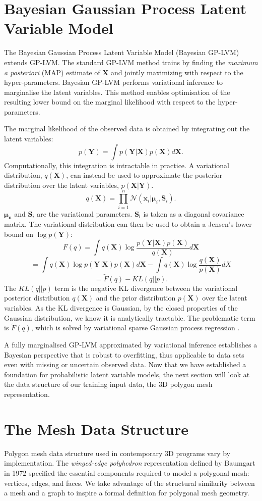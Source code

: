 \documentclass[ %
author={Dillon Keith Diep},
supervisor={Dr. Carl Henrik Ek},
degree={MEng},
title={ART-CG Hair:},
subtitle={Assisted Real-time Content Generation of Stylised Virtual Hair},
type={Research},
year={2017} ]{dissertation}
\begin{document}
\section{Bayesian Gaussian Process Latent Variable Model}
The Bayesian Gaussian Process Latent Variable Model (Bayesian GP-LVM) \cite{bgplvm} extends GP-LVM. The standard GP-LVM method trains by finding the \textit{maximum a posteriori} (MAP) estimate of $\bm{X}$ and jointly maximizing with respect to the hyper-parameters. Bayesian GP-LVM performs variational inference to marginalise the latent variables. This method enables optimisation of the resulting lower bound on the marginal likelihood with respect to the hyper-parameters. 

The marginal likelihood of the observed data is obtained by integrating out the latent variables:
$$p(\bm{Y})=\int p(\bm{Y|X})p(\bm{X})d\bm{X}.$$
Computationally, this integration is intractable in practice. A variational distribution, $q(\bm{X})$, can instead be used to approximate the posterior distribution over the latent variables, $p(\bm{X|Y})$.
$$q(\bm{X})=\prod^n_{i=1}\mathcal{N}(\bm{x}_i|\bm{\mu}_i,\bm{S}_i).$$
$\bm{\mu_n}$ and $\bm{S}_i$ are the variational parameters. $\bm{S_i}$ is taken as a diagonal covariance matrix. 
The variational distribution can then be used to obtain a Jensen's lower bound on $\log p(\bm{Y})$:
$$F(q)=\int q(\bm{X})\log \frac{ p(\bm{Y|X})p(\bm{X}) }{ q(\bm{X}) } d\bm{X}$$
$$=\int q(\bm{X})\log p(\bm{Y|X})p(\bm{X})d\bm{X} - \int q(\bm{X})\log\frac{q(\bm{X})}{p(\bm{X})}dX$$
$$=\tilde{F}(q)-KL(q||p).$$
The $KL(q||p)$ term is the negative KL divergence between the variational posterior distribution $q(\bm{X})$ and the prior distribution $p(\bm{X})$ over the latent variables. As the KL divergence is Gaussian, by the closed properties of the Gaussian distribution, we know it is analytically tractable. The problematic term is $\tilde{F}(q)$, which is solved by variational sparse Gaussian process regression \cite{bgplvm}.

A fully marginalised GP-LVM approximated by variational inference establishes a Bayesian perspective that is robust to overfitting, thus applicable to data sets even with missing or uncertain observed data. Now that we have established a foundation for probabilistic latent variable models, the next section will look at the data structure of our training input data, the 3D polygon mesh representation.

\section{The Mesh Data Structure}
Polygon mesh data structure used in contemporary 3D programs vary by implementation. The \textit{winged-edge polyhedron} representation defined by Baumgart in 1972 \cite{wingededge} specified the essential components required to model a polygonal mesh: vertices, edges, and faces. We take advantage of the structural similarity between a mesh and a graph to inspire a formal definition for polygonal mesh geometry.
\end{document}
